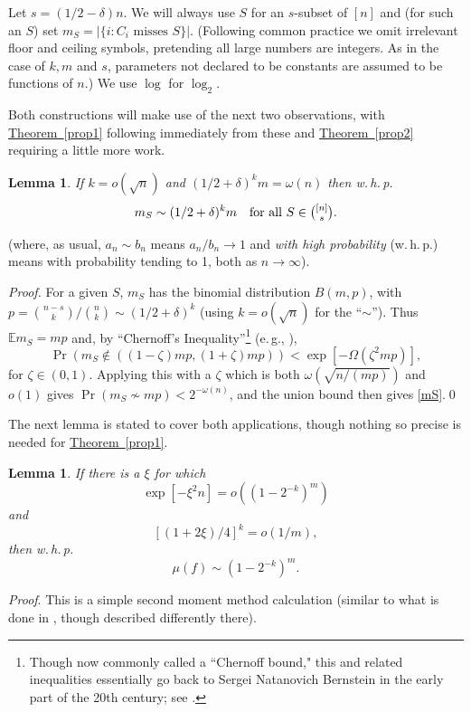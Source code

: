 \documentclass[11pt]{article}
\numberwithin{equation}{section}
\newtheorem{lemma}[theorem]{Lemma}
\theoremstyle{definition}
\theoremstyle{plain}
\newcommand{\eg}{e.\,g.}
\newcommand{\expref}[2]{\hyperref[#2]{#1~\ref{#2}}}
\newcommand{\beq}[1]{\begin{equation}\label{#1}}
\newcommand{\enq}[0]{\end{equation}}
\newcommand{\mn}[0]{\medskip\noindent}
\newcommand{\nin}[0]{\noindent}
\newcommand{\ra}[0]{\rightarrow}
\newcommand{\0}[0]{\emptyset}
\newcommand{\Cc}[0]{\tbinom}
\newcommand{\gd}[0]{\delta }
\newcommand{\go}[0]{\omega}
\newcommand{\gO}[0]{\Omega}
\newcommand{\gz}[0]{\zeta}
\begin{document}
Let $s= (1/2-\gd)n$.  %
We will always
use $S$ for an $s$-subset of $[n]$ and
(for such an $S$) set
$m_S=|\{i:\mbox{$C_i$ misses $S$}\}|.$
(Following common practice we omit irrelevant
floor and ceiling symbols,
pretending all large numbers are integers.
As in the case of $k,m$ and $s$, parameters not declared
to be constants are assumed to be functions of $n$.)
We use $\log$ for $\log_2$.


Both constructions will make use of the next two
observations, with \expref{Theorem}{prop1}
following immediately from these and
\expref{Theorem}{prop2} requiring a little more work.
\begin{lemma}\label{mSlemma}
If $k=o(\sqrt{n})$ and $(1/2+\gd)^km=\go(n)$ then
w.\,h.\,p.
\beq{mS}
%
%
%
%
%
%
%
m_S \sim (1/2+\gd)^km ~~ \text{ for all } S\in \Cc{[n]}{s}. %
%
\enq
\end{lemma}
\nin
(where, as usual, $a_n\sim b_n$ means $a_n/b_n\ra 1 $
and
\emph{with high probability} (w.\,h.\,p.) means
with probability tending to 1, both as $n\ra\infty$).


\mn
\emph{Proof.}
For a given $S$, $m_S$ has the binomial distribution
$B(m,p)$, with $p = \binom{n-s}{k}/\binom{n}{k}\sim(1/2+\gd)^k$
(using $k=o(\sqrt{n})$ for the ``$\sim $'').
Thus
$\mathbb E  m_S=mp$ and,
by ``Chernoff's Inequality''\footnote{Though now commonly called a ``Chernoff bound," this and related inequalities essentially go back to
 Sergei Natanovich  %
Bernstein in the early
part of the 20th century; see \cite{Wiki}.}
%
%
%
%
%
%
(\eg, \cite[Theorem 2.1]{JLR}),
\begin{equation}   \label{eq:chernoff}
\Pr(m_S\not\in ((1-\gz)mp,(1+\gz)mp)) < \exp [-\gO(\gz^2mp)],
\end{equation}
for $\gz\in (0,1)$.
Applying this with a $\gz$ which is both
$\go(\sqrt{n/(mp)})$ and $o(1)$ gives
$\Pr(m_S\not\sim mp )< 2^{-\go(n)}$,
and the union bound then gives \eqref{mS}.\qed


\medskip
The next lemma is stated to cover
both applications, though nothing so precise
is needed for \expref{Theorem}{prop1}.

\begin{lemma}\label{muflemma}
If there is a $\xi$ for which
\beq{xi1}
\exp[-\xi^2n] = o((1-2^{-k})^m)
\enq
and
\beq{xi2}
[(1+2\xi)/4]^k=o(1/m),
\enq
then
w.\,h.\,p.
\beq{muf}
\mu(f) \sim (1-2^{-k})^m.
\enq
\end{lemma}


\mn
\emph{Proof}.
This is a simple second moment method calculation
(similar to %
what is %
done in \cite{AL}, though described
differently there).
\end{document}

